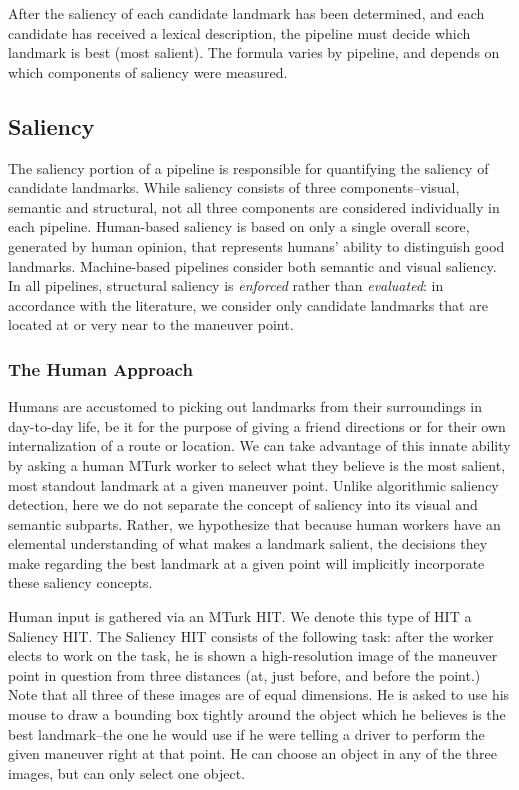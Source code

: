 After the saliency of each candidate landmark has been determined, and each candidate has received a lexical description, the pipeline must decide which landmark is best (most salient). The formula varies by pipeline, and depends on which components of saliency were measured.

\subsection{Saliency}
The saliency portion of a pipeline is responsible for quantifying the saliency of candidate landmarks. While saliency consists of three components--visual, semantic and structural, not all three components are considered individually in each pipeline. Human-based saliency is based on only a single overall score, generated by human opinion, that represents humans' ability to distinguish good landmarks. Machine-based pipelines consider both semantic and visual saliency. In all pipelines, structural saliency is \textit{enforced} rather than \textit{evaluated}: in accordance with the literature, we consider only candidate landmarks that are located at or very near to the maneuver point.

\subsubsection{The Human Approach}
Humans are accustomed to picking out landmarks from their surroundings in day-to-day life, be it for the purpose of giving a friend directions or for their own internalization of a route or location. We can take advantage of this innate ability by asking a human MTurk worker to select what they believe is the most salient, most standout landmark at a given maneuver point. Unlike algorithmic saliency detection, here we do not separate the concept of saliency into its visual and semantic subparts. Rather, we hypothesize that because human workers have an elemental understanding of what makes a landmark salient, the decisions they make regarding the best landmark at a given point will implicitly incorporate these saliency concepts.

Human input is gathered via an MTurk HIT. We denote this type of HIT a Saliency HIT. The Saliency HIT consists of the following task: after the worker elects to work on the task, he is shown a high-resolution image of the maneuver point in question from three distances (at, just before, and before the point.) Note that all three of these images are of equal dimensions. He is asked to use his mouse to draw a bounding box tightly around the object which he believes is the best landmark--the one he would use if he were telling a driver to perform the given maneuver right at that point. He can choose an object in any of the three images, but can only select one object.

